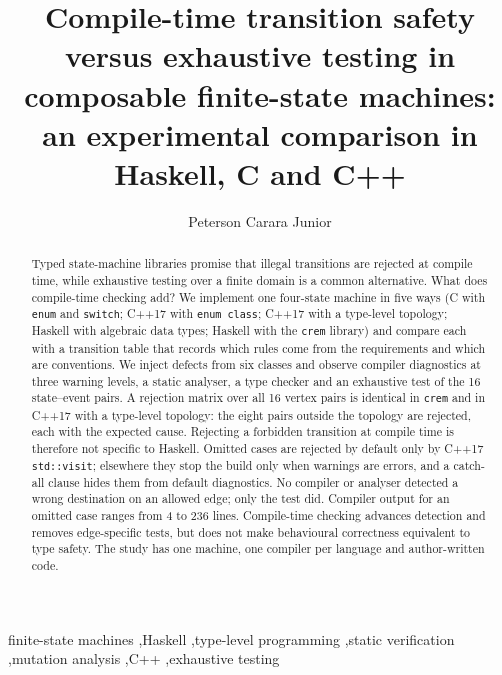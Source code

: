 \documentclass[review,12pt]{elsarticle}
\newcommand{\code}[1]{\texttt{#1}}
\begin{document}
\begin{frontmatter}

\title{Compile-time transition safety versus exhaustive testing in composable finite-state machines: an experimental comparison in Haskell, C and C++}

\author[fatec]{Peterson Carara Junior}

\begin{abstract}
Typed state-machine libraries promise that illegal transitions are rejected at compile time, while exhaustive testing over a finite domain is a common alternative. What does compile-time checking add? We implement one four-state machine in five ways (C with \code{enum} and \code{switch}; C++17 with \code{enum class}; C++17 with a type-level topology; Haskell with algebraic data types; Haskell with the \code{crem} library) and compare each with a transition table that records which rules come from the requirements and which are conventions. We inject defects from six classes and observe compiler diagnostics at three warning levels, a static analyser, a type checker and an exhaustive test of the 16 state--event pairs. A rejection matrix over all 16 vertex pairs is identical in \code{crem} and in C++17 with a type-level topology: the eight pairs outside the topology are rejected, each with the expected cause. Rejecting a forbidden transition at compile time is therefore not specific to Haskell. Omitted cases are rejected by default only by C++17 \code{std::visit}; elsewhere they stop the build only when warnings are errors, and a catch-all clause hides them from default diagnostics. No compiler or analyser detected a wrong destination on an allowed edge; only the test did. Compiler output for an omitted case ranges from 4 to 236 lines. Compile-time checking advances detection and removes edge-specific tests, but does not make behavioural correctness equivalent to type safety. The study has one machine, one compiler per language and author-written code.
\end{abstract}

\begin{keyword}
finite-state machines \sep Haskell \sep type-level programming \sep static verification \sep mutation analysis \sep C++ \sep exhaustive testing
\end{keyword}

\end{frontmatter}
\end{document}
